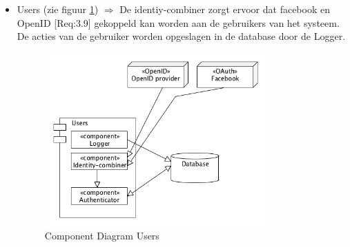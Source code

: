 \documentclass[a4paper,10pt]{article}
\begin{document}
		\begin{itemize}
			\item Users (zie figuur \ref{componentdiagramuser}) $\Rightarrow$ De identiy-combiner zorgt ervoor dat facebook en OpenID [Req:3.9]
 gekoppeld kan worden aan de gebruikers van het systeem. De acties van de gebruiker worden opgeslagen in de database door de Logger.
				\begin{figure}[ht!]
				\centering
				\includegraphics[width=8.5cm]{componentDiagram_user.png}
				\caption{Component Diagram Users \label{componentdiagramuser}}
				\end{figure}
			

\end{itemize}
\end{document}
